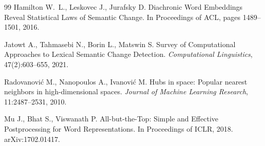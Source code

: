 \documentclass[withoutpreface]{cumcmthesis}
\begin{document}
\begin{thebibliography}{99}
Hamilton W.~L., Leskovec J., Jurafsky D.
Diachronic Word Embeddings Reveal Statistical Laws of Semantic Change.
In Proceedings of ACL, pages 1489--1501, 2016.

Jatowt A., Tahmasebi N., Borin L., Matswin S.
Survey of Computational Approaches to Lexical Semantic Change Detection.
\emph{Computational Linguistics}, 47(2):603--655, 2021.

Radovanovi\'c M., Nanopoulos A., Ivanovi\'c M.
Hubs in space: Popular nearest neighbors in high-dimensional spaces.
\emph{Journal of Machine Learning Research}, 11:2487--2531, 2010.

Mu J., Bhat S., Viswanath P.
All-but-the-Top: Simple and Effective Postprocessing for Word Representations.
In Proceedings of ICLR, 2018.
arXiv:1702.01417.

\end{thebibliography}
\end{document}
